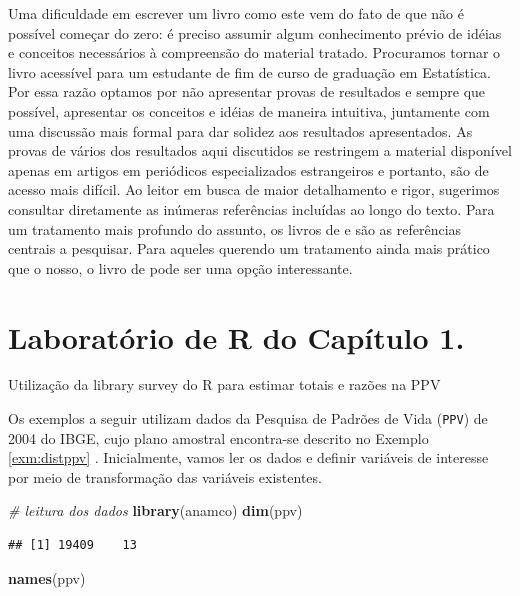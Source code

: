 \documentclass[]{book}
\newenvironment{Shaded}{\begin{snugshade}}{\end{snugshade}}
\newcommand{\KeywordTok}[1]{\textcolor[rgb]{0.13,0.29,0.53}{\textbf{#1}}}
\newcommand{\CommentTok}[1]{\textcolor[rgb]{0.56,0.35,0.01}{\textit{#1}}}
\newcommand{\NormalTok}[1]{#1}
\theoremstyle{definition}
\theoremstyle{definition}
\theoremstyle{definition}
\theoremstyle{remark}
\let\BeginKnitrBlock\begin \let\EndKnitrBlock\end
\begin{document}
Uma dificuldade em escrever um livro como este vem do fato de que não é
possível começar do zero: é preciso assumir algum conhecimento prévio de
idéias e conceitos necessários à compreensão do material tratado.
Procuramos tornar o livro acessível para um estudante de fim de curso de
graduação em Estatística. Por essa razão optamos por não apresentar
provas de resultados e sempre que possível, apresentar os conceitos e
idéias de maneira intuitiva, juntamente com uma discussão mais formal
para dar solidez aos resultados apresentados. As provas de vários dos
resultados aqui discutidos se restringem a material disponível apenas em
artigos em periódicos especializados estrangeiros e portanto, são de
acesso mais difícil. Ao leitor em busca de maior detalhamento e rigor,
sugerimos consultar diretamente as inúmeras referências incluídas ao
longo do texto. Para um tratamento mais profundo do assunto, os livros
de \citep{SHS89} e \citep{CHSK2003} são as referências centrais a
pesquisar. Para aqueles querendo um tratamento ainda mais prático que o
nosso, o livro de \citep{lethonen} pode ser uma opção interessante.

\section{Laboratório de R do Capítulo 1.}\label{epa}

\BeginKnitrBlock{example}
\protect\hypertarget{exm:exe12}{}{\label{exm:exe12} }Utilização da library
survey do R para estimar totais e razões na PPV
\EndKnitrBlock{example} Os exemplos a seguir utilizam dados da Pesquisa
de Padrões de Vida (\texttt{PPV}) de 2004 do IBGE, cujo plano amostral
encontra-se descrito no Exemplo \ref{exm:distppv} . Inicialmente, vamos
ler os dados e definir variáveis de interesse por meio de transformação
das variáveis existentes.

\begin{Shaded}
\begin{Highlighting}[]
\CommentTok{# leitura dos dados}
\KeywordTok{library}\NormalTok{(anamco)}
\KeywordTok{dim}\NormalTok{(ppv)}
\end{Highlighting}
\end{Shaded}

\begin{verbatim}
## [1] 19409    13
\end{verbatim}

\begin{Shaded}
\begin{Highlighting}[]
\KeywordTok{names}\NormalTok{(ppv)}
\end{Highlighting}
\end{Shaded}
\end{document}
